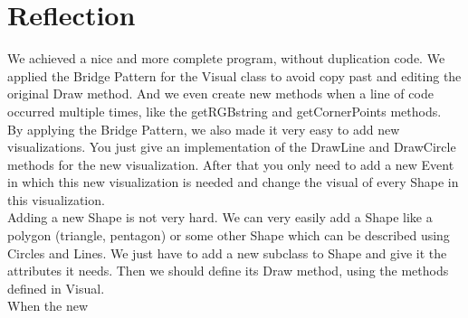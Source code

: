 \documentclass[a4paper,12pt]{article}
\begin{document}
\section{Reflection}
We achieved a nice and more complete program, without duplication code. We applied the Bridge Pattern for the Visual class to avoid copy past and editing the original Draw method. And we even create new methods when a line of code occurred multiple times, like the getRGBstring and getCornerPoints methods.
\\
By applying the Bridge Pattern, we also made it very easy to add new visualizations. You just give an implementation of the DrawLine and DrawCircle methods for the new visualization. After that you only need to add a new Event in which this new visualization is needed and change the visual of every Shape in this visualization.
\\
Adding a new Shape is not very hard. We can very easily add a Shape like a polygon (triangle, pentagon) or some other Shape which can be described using Circles and Lines. We just have to add a new subclass to Shape and give it the attributes it needs. Then we should define its Draw method, using the methods defined in Visual.
\\
When the new
\end{document}
